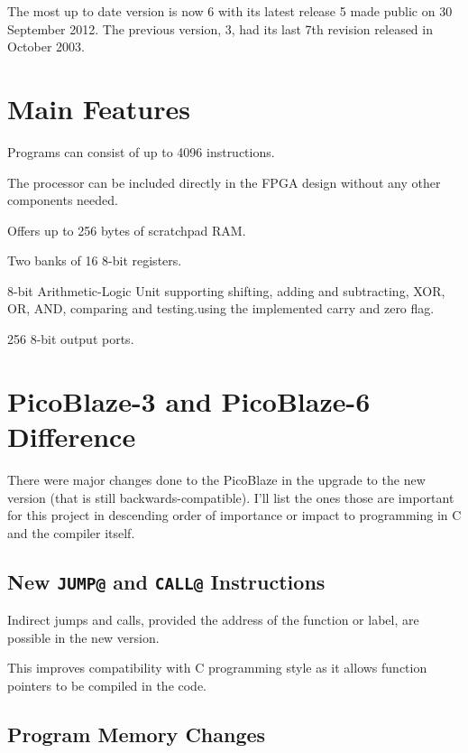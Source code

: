 The most up to date version is now 6 with its latest release 5 made public on 30 September 2012. The previous version, 3, had its last 7th revision released in October 2003. %

    \section{Main Features}


    Programs can consist of up to 4096 instructions.

    The processor can be included directly in the FPGA design without any other components needed.

    Offers up to 256 bytes of scratchpad RAM.

    Two banks of 16 8-bit registers.

    8-bit Arithmetic-Logic Unit supporting shifting, adding and subtracting, XOR, OR, AND, comparing and testing.using the implemented carry and zero flag.

    256 8-bit output ports.

    \section{PicoBlaze-3 and PicoBlaze-6 Difference}

    There were major changes done to the PicoBlaze in the upgrade to the new version (that is still backwards-compatible). I'll list the ones those are important for this project in descending order of importance or impact to programming in C and the compiler itself.


        \subsection{New \texttt{JUMP@} and \texttt{CALL@} Instructions}

        Indirect jumps and calls, provided the address of the function or label, are possible in the new version.

        This improves compatibility with C programming style %
        as it allows function pointers to be compiled in the code.

        \subsection{Program Memory Changes}

